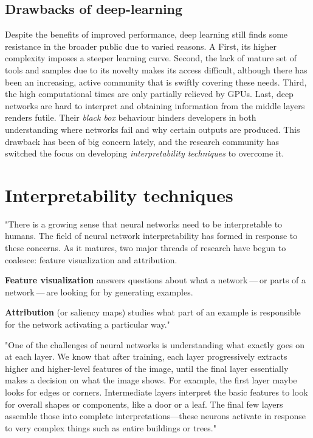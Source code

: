 	\subsection{Drawbacks of deep-learning}
	Despite the benefits of improved performance, deep learning still finds some resistance in the broader public due to varied reasons. A First, its higher complexity imposes a steeper learning curve. Second, the lack of mature set of tools and samples due to its novelty makes its access difficult, although there has been an increasing, active community that is swiftly covering these needs. Third, the high computational times are only partially relieved by GPUs. Last, deep networks are hard to interpret and obtaining information from the middle layers renders futile. Their \textit{black box} behaviour hinders developers in both understanding where networks fail and why certain outputs are produced. This drawback has been of big concern lately, and the research community has switched the focus on developing \textit{interpretability techniques} to overcome it.
	

\section{Interpretability techniques}

"There is a growing sense that neural networks need to be interpretable to humans. The field of neural network interpretability has formed in response to these concerns. As it matures, two major threads of research have begun to coalesce: feature visualization and attribution. 

\textbf{Feature visualization} answers questions about what a network — or parts of a network — are looking for by generating examples.

\textbf{Attribution} (or saliency maps) studies what part of an example is responsible for the network activating a particular way." \cite{Olah2017}

"One of the challenges of neural networks is understanding what exactly goes on at each layer.
We know that after training, each layer progressively extracts higher and higher-level features of the image, until the final layer essentially makes a decision on what the image shows.
For example, the first layer maybe looks for edges or corners.
Intermediate layers interpret the basic features to look for overall shapes or components, like a door or a leaf.
The final few layers assemble those into complete interpretations---these neurons activate in response to very complex things such as entire buildings or trees." \cite{Mordvintsev2015}

